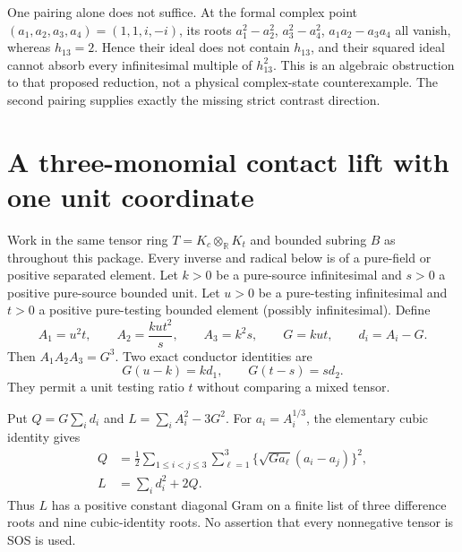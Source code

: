 One pairing alone does not suffice. At the formal complex point
$(a_1,a_2,a_3,a_4)=(1,1,i,-i)$, its roots
$a_1^2-a_2^2$, $a_3^2-a_4^2$, $a_1a_2-a_3a_4$ all vanish, whereas
$h_{13}=2$. Hence their ideal does not contain $h_{13}$, and their squared
ideal cannot absorb every infinitesimal multiple of $h_{13}^2$.
This is an algebraic obstruction to that proposed reduction, not a physical
complex-state counterexample. The second pairing supplies exactly the
missing strict contrast direction.


\section{\texorpdfstring{A three-monomial contact lift with one unit coordinate}{A three-monomial contact lift with one unit coordinate}}
\label{component:p466b31015532}

\label{p466b31015532:sec:three-circuit}

Work in the same tensor ring $T=K_c\otimes_{\mathbb R}K_t$ and bounded
subring $B$ as throughout this package. Every inverse and radical below
is of a pure-field or positive separated element. Let $k>0$ be a
pure-source infinitesimal and $s>0$ a positive pure-source bounded unit.
Let $u>0$ be a pure-testing infinitesimal and $t>0$ a positive
pure-testing bounded element (possibly infinitesimal). Define
\[
 A_1=u^2t,\qquad A_2=\frac{ku t^2}{s},\qquad A_3=k^2s,
 \qquad G=kut,\qquad d_i=A_i-G.
\]
Then $A_1A_2A_3=G^3$. Two exact conductor identities are
\begin{equation}\label{p466b31015532:T3:conductors}
 G(u-k)=k d_1,\qquad G(t-s)=s d_2.
\end{equation}
They permit a unit testing ratio $t$ without comparing a mixed tensor.

Put $Q=G\sum_i d_i$ and $L=\sum_i A_i^2-3G^2$.
For $a_i=A_i^{1/3}$, the elementary cubic identity gives
\begin{align}\label{p466b31015532:T3:sos}
 Q&=\frac12\sum_{1\le i<j\le3}\sum_{\ell=1}^3
       \{\sqrt{G a_\ell}(a_i-a_j)\}^2,\\
 L&=\sum_i d_i^2+2Q.\nonumber
\end{align}
Thus $L$ has a positive constant diagonal Gram on a finite list of
three difference roots and nine cubic-identity roots. No assertion
that every nonnegative tensor is SOS is used.

